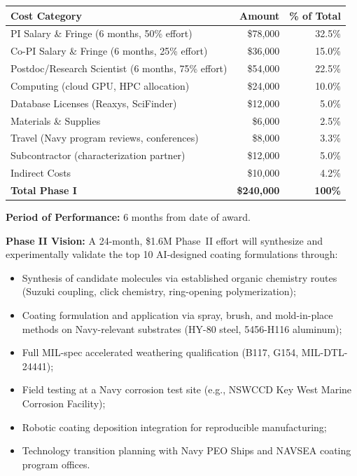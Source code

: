 \documentclass[11pt,letterpaper]{article}
\begin{document}
\begin{center}
\begin{tabular}{lrr}
\toprule
\textbf{Cost Category} & \textbf{Amount} & \textbf{\% of Total} \\
\midrule
PI Salary \& Fringe (6 months, 50\% effort) & \$78,000 & 32.5\% \\
Co-PI Salary \& Fringe (6 months, 25\% effort) & \$36,000 & 15.0\% \\
Postdoc/Research Scientist (6 months, 75\% effort) & \$54,000 & 22.5\% \\
Computing (cloud GPU, HPC allocation) & \$24,000 & 10.0\% \\
Database Licenses (Reaxys, SciFinder) & \$12,000 & 5.0\% \\
Materials \& Supplies & \$6,000 & 2.5\% \\
Travel (Navy program reviews, conferences) & \$8,000 & 3.3\% \\
Subcontractor (characterization partner) & \$12,000 & 5.0\% \\
Indirect Costs & \$10,000 & 4.2\% \\
\midrule
\textbf{Total Phase I} & \textbf{\$240,000} & \textbf{100\%} \\
\bottomrule
\end{tabular}
\end{center}

\vspace{0.3cm}
\noindent\textbf{Period of Performance:} 6 months from date of award.

\noindent\textbf{Phase II Vision:} A 24-month, \$1.6M Phase~II effort will
synthesize and experimentally validate the top 10 AI-designed coating
formulations through:
\begin{itemize}[nosep]
  \item Synthesis of candidate molecules via established organic chemistry
    routes (Suzuki coupling, click chemistry, ring-opening polymerization);
  \item Coating formulation and application via spray, brush, and mold-in-place
    methods on Navy-relevant substrates (HY-80 steel, 5456-H116 aluminum);
  \item Full MIL-spec accelerated weathering qualification (B117, G154,
    MIL-DTL-24441);
  \item Field testing at a Navy corrosion test site (e.g., NSWCCD Key West
    Marine Corrosion Facility);
  \item Robotic coating deposition integration for reproducible manufacturing;
  \item Technology transition planning with Navy PEO Ships and NAVSEA coating
    program offices.
\end{itemize}
\end{document}
